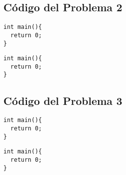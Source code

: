 \documentclass[a4paper]{article}
\begin{document}
\newpage
\subsection{Código del Problema 2}

\begin{lstlisting}
int main(){
  return 0;
}
\end{lstlisting}

\vspace*{0.5cm}

\begin{lstlisting}
int main(){
  return 0;
}
\end{lstlisting}


\newpage
\subsection{Código del Problema 3}

\begin{lstlisting}
int main(){
  return 0;
}
\end{lstlisting}

\vspace*{0.5cm}

\begin{lstlisting}
int main(){
  return 0;
}
\end{lstlisting}
\end{document}

